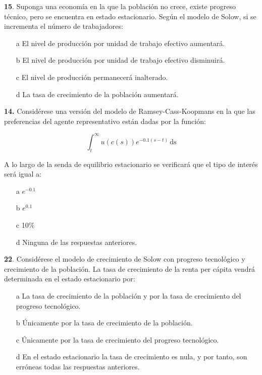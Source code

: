 \documentclass{nuevotema}
\begin{document}

\textbf{15}. Suponga una economía en la que la población no crece, existe progreso técnico, pero se encuentra en estado estacionario. Según el modelo de Solow, si se incrementa el número de trabajadores:

\begin{enumerate}
    \item[a] El nivel de producción por unidad de trabajo efectivo aumentará.
    \item[b] El nivel de producción por unidad de trabajo efectivo disminuirá.
    \item[c] El nivel de producción permanecerá inalterado.
    \item[d] La tasa de crecimiento de la población aumentará.
\end{enumerate}


\textbf{14.} Considérese una versión del modelo de Ramsey-Cass-Koopmans en la que las preferencias del agente representativo están dadas por la función:

\begin{equation}
\int_t^\infty u\left( c(s) \right) e^{-0.1(s-t)} \, \text{ds}
\end{equation}

A lo largo de la senda de equilibrio estacionario se verificará que el tipo de interés será igual a:

\begin{enumerate}
    \item[a] $e^{-0.1}$
    \item[b] $e^{0.1}$
    \item[c] 10\%
    \item[d] Ninguna de las respuestas anteriores.
\end{enumerate}

\textbf{22}. Considérese el modelo de crecimiento de Solow con progreso tecnológico y crecimiento de la población. La tasa de crecimiento de la renta per cápita vendrá determinada en el estado estacionario por:

\begin{enumerate}
    \item[a] La tasa de crecimiento de la población y por la tasa de crecimiento del progreso tecnológico.
    \item[b] Únicamente por la tasa de crecimiento de la población.
    \item[c] Únicamente por la tasa de crecimiento del progreso tecnológico.
    \item[d] En el estado estacionario la tasa de crecimiento es nula, y por tanto, son erróneas todas las respuestas anteriores.
\end{enumerate}
\end{document}
